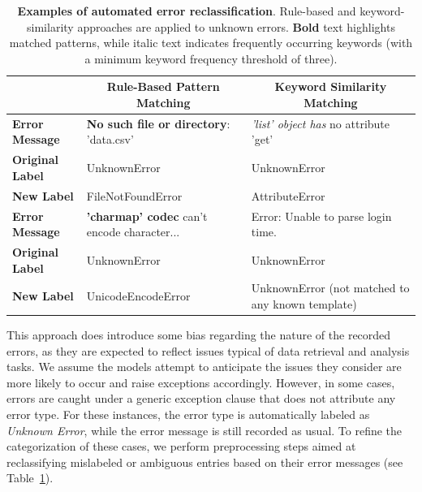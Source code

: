 \documentclass{DESSThesis}
\begin{document}
\begin{table}[ht]
    \centering
    \small
    \begin{tabular}{p{2.3cm}|p{5.7cm}|p{5.7cm}}
    \toprule
    \multicolumn{1}{c|}{} & \multicolumn{1}{c|}{\textbf{Rule-Based Pattern Matching}} & \multicolumn{1}{c}{\textbf{Keyword Similarity Matching}} \\
    \midrule
    \midrule 
    \textbf{Error Message} & \textbf{No such file or directory}: 'data.csv' & \emph{'list' object has} no attribute 'get' \\
    \midrule
    \textbf{Original Label} & UnknownError & UnknownError \\
    \midrule
    \textbf{New Label} & FileNotFoundError & AttributeError \\
    \midrule
    \midrule 
    \textbf{Error Message} & \textbf{'charmap' codec} can't encode character... & Error: Unable to parse login time. \\
    \midrule
    \textbf{Original Label} & UnknownError & UnknownError \\
    \midrule
    \textbf{New Label} & UnicodeEncodeError  & UnknownError \newline (not matched to any known template) \\
    \bottomrule
    \end{tabular}
    \caption[Examples of automated error reclassification]{\textbf{Examples of automated error reclassification}. Rule-based and keyword-similarity approaches are applied to unknown errors. \textbf{Bold} text highlights matched patterns, while italic text indicates frequently occurring keywords (with a minimum keyword frequency threshold of three).}
    \label{tab:automated_error_reclassification}
\end{table}

This approach does introduce some bias regarding the nature of the recorded errors, as they are expected to reflect issues typical of data retrieval and analysis tasks. We assume the models attempt to anticipate the issues they consider are more likely to occur and raise exceptions accordingly. However, in some cases, errors are caught under a generic exception clause that does not attribute any error type. For these instances, the error type is automatically labeled as \emph{Unknown Error}, while the error message is still recorded as usual. To refine the categorization of these cases, we perform preprocessing steps aimed at reclassifying mislabeled or ambiguous entries based on their error messages (see Table~\ref{tab:automated_error_reclassification}).
\end{document}
